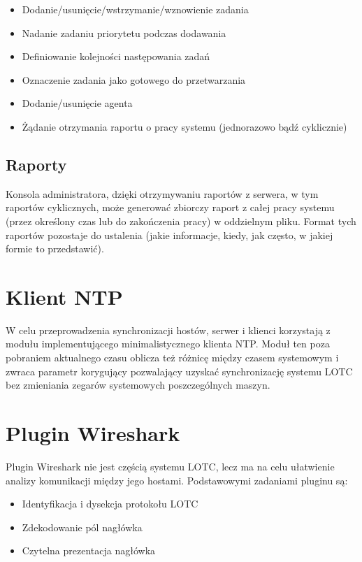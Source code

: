 \documentclass[10pt,a4paper]{article}
\begin{document}
			\begin{itemize}   
				\item Dodanie/usunięcie/wstrzymanie/wznowienie zadania
				\item Nadanie zadaniu priorytetu podczas dodawania
				\item Definiowanie kolejności następowania zadań
				\item Oznaczenie zadania jako gotowego do przetwarzania
				\item Dodanie/usunięcie agenta
				\item Żądanie otrzymania raportu o pracy systemu (jednorazowo bądź cyklicznie)
			\end{itemize}
		
		\subsection{Raporty}
			Konsola administratora, dzięki otrzymywaniu raportów z serwera, w tym raportów cyklicznych, może generować zbiorczy raport z całej pracy systemu (przez określony czas lub do zakończenia pracy) w oddzielnym pliku. Format tych raportów pozostaje do ustalenia (jakie informacje, kiedy, jak często, w jakiej formie to przedstawić).
    
    \section{Klient NTP}
    
        W celu przeprowadzenia synchronizacji hostów, serwer i klienci korzystają z modułu implementującego minimalistycznego klienta NTP. Moduł ten poza pobraniem aktualnego czasu oblicza też różnicę między czasem systemowym i zwraca parametr korygujący pozwalający uzyskać synchronizację systemu LOTC bez zmieniania zegarów systemowych poszczególnych maszyn. 
    
    \section{Plugin Wireshark}
    
        Plugin Wireshark nie jest częścią systemu LOTC, lecz ma na celu ułatwienie analizy komunikacji między jego hostami. Podstawowymi zadaniami pluginu są:
        
        \begin{itemize}   
			\item Identyfikacja i dysekcja protokołu LOTC
			\item Zdekodowanie pól nagłówka
		    \item Czytelna prezentacja nagłówka
	    \end{itemize}    
    
\end{document}
